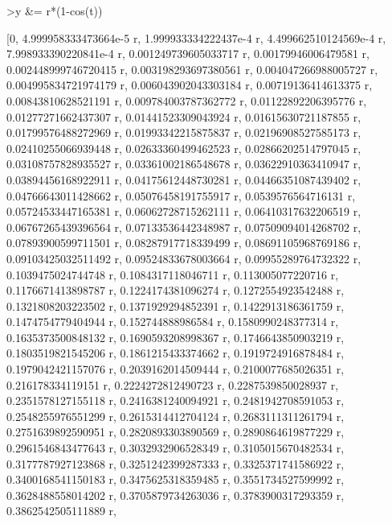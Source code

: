 \documentclass[a4paper,10pt]{article}
\begin{document}
\begin{eulernotebook}
\begin{eulercomment}
\begin{eulercomment}
\begin{eulercomment}
\begin{eulercomment}
\begin{eulercomment}
\begin{eulercomment}
\begin{eulercomment}
\begin{eulercomment}
\begin{eulercomment}
\begin{eulercomment}
\begin{eulercomment}
\begin{eulercomment}
\begin{eulercomment}
\begin{eulercomment}
\begin{eulercomment}
\begin{eulercomment}
\begin{eulercomment}
\begin{eulercomment}
\begin{eulercomment}
\begin{eulercomment}
\begin{euleroutput}
\end{euleroutput}
\begin{eulerprompt}
>y &= r*(1-cos(t))
\end{eulerprompt}
\begin{euleroutput}
  
          [0, 4.999958333473664e-5 r, 1.999933334222437e-4 r, 
  4.499662510124569e-4 r, 7.998933390220841e-4 r, 
  0.001249739605033717 r, 0.00179946006479581 r, 
  0.002448999746720415 r, 0.003198293697380561 r, 
  0.004047266988005727 r, 0.004995834721974179 r, 
  0.006043902043303184 r, 0.00719136414613375 r, 0.00843810628521191 r, 
  0.009784003787362772 r, 0.01122892206395776 r, 0.01277271662437307 r, 
  0.01441523309043924 r, 0.01615630721187855 r, 0.01799576488272969 r, 
  0.01993342215875837 r, 0.02196908527585173 r, 0.02410255066939448 r, 
  0.02633360499462523 r, 0.02866202514797045 r, 0.03108757828935527 r, 
  0.03361002186548678 r, 0.03622910363410947 r, 0.03894456168922911 r, 
  0.04175612448730281 r, 0.04466351087439402 r, 0.04766643011428662 r, 
  0.05076458191755917 r, 0.0539576564716131 r, 0.05724533447165381 r, 
  0.06062728715262111 r, 0.06410317632206519 r, 0.06767265439396564 r, 
  0.07133536442348987 r, 0.07509094014268702 r, 0.07893900599711501 r, 
  0.08287917718339499 r, 0.08691105968769186 r, 0.09103425032511492 r, 
  0.09524833678003664 r, 0.09955289764732322 r, 0.1039475024744748 r, 
  0.1084317118046711 r, 0.113005077220716 r, 0.1176671413898787 r, 
  0.1224174381096274 r, 0.1272554923542488 r, 0.1321808203223502 r, 
  0.1371929294852391 r, 0.1422913186361759 r, 0.1474754779404944 r, 
  0.152744888986584 r, 0.1580990248377314 r, 0.1635373500848132 r, 
  0.1690593208998367 r, 0.1746643850903219 r, 0.1803519821545206 r, 
  0.1861215433374662 r, 0.1919724916878484 r, 0.1979042421157076 r, 
  0.2039162014509444 r, 0.2100077685026351 r, 0.216178334119151 r, 
  0.2224272812490723 r, 0.2287539850028937 r, 0.2351578127155118 r, 
  0.2416381240094921 r, 0.2481942708591053 r, 0.2548255976551299 r, 
  0.2615314412704124 r, 0.2683111311261794 r, 0.2751639892590951 r, 
  0.2820893303890569 r, 0.2890864619877229 r, 0.2961546843477643 r, 
  0.3032932906528349 r, 0.3105015670482534 r, 0.3177787927123868 r, 
  0.3251242399287333 r, 0.3325371741586922 r, 0.3400168541150183 r, 
  0.3475625318359485 r, 0.3551734527599992 r, 0.3628488558014202 r, 
  0.3705879734263036 r, 0.3783900317293359 r, 0.3862542505111889 r, 

\end{euleroutput}
\end{eulercomment}
\end{eulercomment}
\end{eulercomment}
\end{eulercomment}
\end{eulercomment}
\end{eulercomment}
\end{eulercomment}
\end{eulercomment}
\end{eulercomment}
\end{eulercomment}
\end{eulercomment}
\end{eulercomment}
\end{eulercomment}
\end{eulercomment}
\end{eulercomment}
\end{eulercomment}
\end{eulercomment}
\end{eulercomment}
\end{eulercomment}
\end{eulercomment}
\end{eulernotebook}
\end{document}
